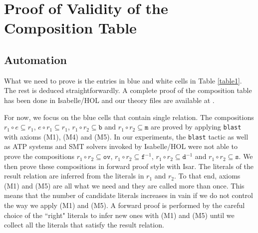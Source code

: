 \documentclass{llncs}
\begin{document}
\section{Proof of Validity of the Composition Table}
\label{sect:proof}
\subsection{Automation}
What we need to prove is the entries in blue and white cells in Table \ref{table1}. The rest is deduced straightforwardly. A complete proof of the composition table has been done in Isabelle/HOL and our theory files are available at \cite{Fadoua:2016}.

For now, we focus on the blue cells that contain single relation. The compositions $r_1 \circ e \subseteq r_1$, $e \circ r_1 \subseteq r_1$, $r_1 \circ r_2 \subseteq \texttt{b}$ and $r_1 \circ r_2 \subseteq \texttt{m}$ are proved by applying \texttt{blast} with axioms (M1), (M4) and (M5).  In our experiments, the \texttt{blast} tactic as well as ATP systems and SMT solvers invoked by Isabelle/HOL were not able to prove the compositions $r_1 \circ r_2 \subseteq \texttt{ov}$, $r_1 \circ r_2 \subseteq \texttt{f}^{-1}$, $r_1 \circ r_2 \subseteq \texttt{d}^{-1}$ and $r_1 \circ r_2 \subseteq \texttt{s}$. %
We then prove these compositions in forward proof style with Isar. The literals of the result relation are inferred from the literals in $r_1$ and $r_2$. To that end, axioms (M1) and (M5) are all what we need and they are called more than once. This means that the number of candidate literals  increases in vain if we do not control the way we apply (M1) and (M5). %
A forward proof is performed by the careful choice of the ``right" literals to infer new ones with (M1) and (M5) until we collect all the literals that satisfy the result relation. 
\end{document}
